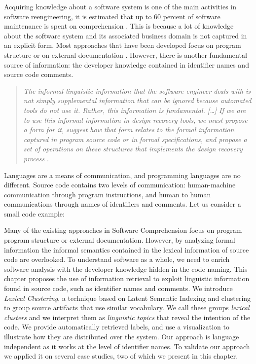 \asteriskasteriskasterisk

Acquiring knowledge about a software system is one of the main activities in software reengineering, it is estimated that up to 60 percent of software maintenance is spent on comprehension \cite{Abra04a}. This is because a lot of knowledge about the software system and its associated business domain is not captured in an explicit form. Most approaches that have been developed focus on program structure \cite{Duca05b} or on external documentation \cite{Maar91a,Anto02b}. However, there is another fundamental source of information: the developer knowledge contained in identifier names and source code comments.

{\small\begin{quotation}\emph{The informal linguistic information that the software engineer deals with is not simply supplemental information that can
be ignored because automated tools do not use it. Rather, this information is fundamental. [\ldots] If we are to use this informal information in design recovery tools, we must propose a form for it, suggest how that form relates to the formal information captured in program source code or in formal specifications, and propose a set of operations on these structures that implements the design recovery process} \cite{Bigg89c}.
\end{quotation}}

Languages are a means of communication, and programming languages are no different. Source code contains two levels of communication: human-machine communication through program instructions, and human to human communications through names of identifiers and comments. Let us consider a small code example:

Many of the existing approaches in Software Comprehension focus on program program structure or external documentation. However, by analyzing formal information the informal semantics contained in the lexical information of source code are overlooked. To understand software as a whole, we need to enrich software analysis with the developer knowledge hidden in the code naming. This chapter proposes the use of information retrieval to exploit linguistic information found in source code, such as identifier names and comments. We introduce \emph{Lexical Clustering}, a technique based on Latent Semantic Indexing and clustering to group source artifacts that use similar vocabulary. We call these groups \emph{lexical clusters} and we interpret them as \emph{linguistic topics} that reveal the intention of the code. We provide automatically retrieved labels, and use a visualization to illustrate how they are distributed over the system. Our approach is language independent as it works at the level of identifier names. To validate our approach we applied it on several case studies, two of which we present in this chapter.

